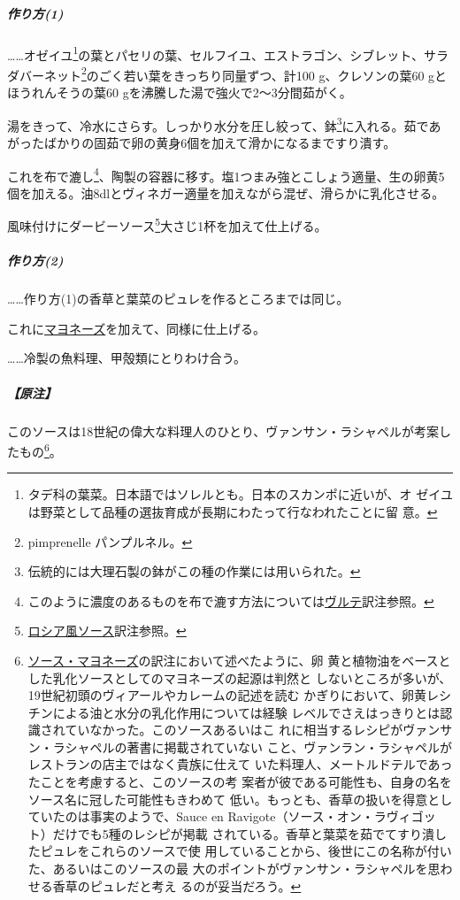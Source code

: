 \begin{recette}

\hypertarget{sauce-vincent-1}{%
\subparagraph{作り方(1)}\label{sauce-vincent-1}}

\ldots{}\ldots{}オゼイユ\footnote{タデ科の葉菜。日本語ではソレルとも。日本のスカンポに近いが、オ
  ゼイユは野菜として品種の選抜育成が長期にわたって行なわれたことに留
  意。}の葉とパセリの葉、セルフイユ、エストラゴン、シブレット、サラダバーネット\footnote{pimprenelle
  パンプルネル。}のごく若い葉をきっちり同量ずつ、計100 g、クレソンの葉60
gとほうれんそうの葉60 gを沸騰した湯で強火で2〜3分間茹がく。

湯をきって、冷水にさらす。しっかり水分を圧し絞って、鉢\footnote{伝統的には大理石製の鉢がこの種の作業には用いられた。}に入れる。茹であがったばかりの固茹で卵の黄身6個を加えて滑かになるまですり潰す。

これを布で漉し\footnote{このように濃度のあるものを布で漉す方法については\protect\hyperlink{veloute}{ヴルテ}訳注参照。}、陶製の容器に移す。塩1つまみ強とこしょう適量、生の卵黄5個を加える。油8dlとヴィネガー適量を加えながら混ぜ、滑らかに乳化させる。

風味付けにダービーソース\footnote{\protect\hyperlink{sauce-russe-froide}{ロシア風ソース}訳注参照。}大さじ1杯を加えて仕上げる。

\hypertarget{sauce-vincent-2}{%
\subparagraph{作り方(2)}\label{sauce-vincent-2}}

\ldots{}\ldots{}作り方(1)の香草と葉菜のピュレを作るところまでは同じ。

これに\protect\hyperlink{mayonnaise}{マヨネーズ}を加えて、同様に仕上げる。

\ldots{}\ldots{}冷製の魚料理、甲殻類にとりわけ合う。

\hypertarget{nota-sauce-vincent}{%
\subparagraph{【原注】}\label{nota-sauce-vincent}}

このソースは18世紀の偉大な料理人のひとり、ヴァンサン・ラシャペルが考案したもの\footnote{\protect\hyperlink{mayonnaise}{ソース・マヨネーズ}の訳注において述べたように、卵
  黄と植物油をベースとした乳化ソースとしてのマヨネーズの起源は判然と
  しないところが多いが、19世紀初頭のヴィアールやカレームの記述を読む
  かぎりにおいて、卵黄レシチンによる油と水分の乳化作用については経験
  レベルでさえはっきりとは認識されていなかった。このソースあるいはこ
  れに相当するレシピがヴァンサン・ラシャペルの著書に掲載されていない
  こと、ヴァンラン・ラシャペルがレストランの店主ではなく貴族に仕えて
  いた料理人、メートルドテルであったことを考慮すると、このソースの考
  案者が彼である可能性も、自身の名をソース名に冠した可能性もきわめて
  低い。もっとも、香草の扱いを得意としていたのは事実のようで、Sauce en
  Ravigote（ソース・オン・ラヴィゴット）だけでも5種のレシピが掲載
  されている。香草と葉菜を茹でてすり潰したピュレをこれらのソースで使
  用していることから、後世にこの名称が付いた、あるいはこのソースの最
  大のポイントがヴァンサン・ラシャペルを思わせる香草のピュレだと考え
  るのが妥当だろう。}。


\end{recette}
